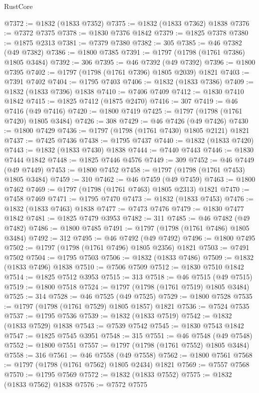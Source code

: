 \begin{lexlean}{RustCore}
\begin{coremodule}
@7372 := @1832 (@1833 @7352)
@7375 := @1832 (@1833 @7362) @1838
@7376 := @7372 @7375
@7378 := @1830 @7376 @1842
@7379 := @1825 @7378
@7380 := @1875 @2313
@7381 := @7379 @7380
@7382 := 305
@7385 := @46 @7382 (@49 @7382)
@7386 := @1800 @7385
@7391 := @1797 (@1798 (@1761 @7386) @1805 @3484)
@7392 := 306
@7395 := @46 @7392 (@49 @7392)
@7396 := @1800 @7395
@7402 := @1797 (@1798 (@1761 @7396) @1805 @2039) @1821
@7403 := @7391 @7402
@7404 := @1795 @7403
@7406 := @1832 (@1833 @7386)
@7409 := @1832 (@1833 @7396) @1838
@7410 := @7406 @7409
@7412 := @1830 @7410 @1842
@7415 := @1825 @7412 (@1875 @2470)
@7416 := 307
@7419 := @46 @7416 (@49 @7416)
@7420 := @1800 @7419
@7425 := @1797 (@1798 (@1761 @7420) @1805 @3484)
@7426 := 308
@7429 := @46 @7426 (@49 @7426)
@7430 := @1800 @7429
@7436 := @1797 (@1798 (@1761 @7430) @1805 @2121) @1821
@7437 := @7425 @7436
@7438 := @1795 @7437
@7440 := @1832 (@1833 @7420)
@7443 := @1832 (@1833 @7430) @1838
@7444 := @7440 @7443
@7446 := @1830 @7444 @1842
@7448 := @1825 @7446 @4576
@7449 := 309
@7452 := @46 @7449 (@49 @7449)
@7453 := @1800 @7452
@7458 := @1797 (@1798 (@1761 @7453) @1805 @3484)
@7459 := 310
@7462 := @46 @7459 (@49 @7459)
@7463 := @1800 @7462
@7469 := @1797 (@1798 (@1761 @7463) @1805 @2313) @1821
@7470 := @7458 @7469
@7471 := @1795 @7470
@7473 := @1832 (@1833 @7453)
@7476 := @1832 (@1833 @7463) @1838
@7477 := @7473 @7476
@7479 := @1830 @7477 @1842
@7481 := @1825 @7479 @3953
@7482 := 311
@7485 := @46 @7482 (@49 @7482)
@7486 := @1800 @7485
@7491 := @1797 (@1798 (@1761 @7486) @1805 @3484)
@7492 := 312
@7495 := @46 @7492 (@49 @7492)
@7496 := @1800 @7495
@7502 := @1797 (@1798 (@1761 @7496) @1805 @2356) @1821
@7503 := @7491 @7502
@7504 := @1795 @7503
@7506 := @1832 (@1833 @7486)
@7509 := @1832 (@1833 @7496) @1838
@7510 := @7506 @7509
@7512 := @1830 @7510 @1842
@7514 := @1825 @7512 @3953
@7515 := 313
@7518 := @46 @7515 (@49 @7515)
@7519 := @1800 @7518
@7524 := @1797 (@1798 (@1761 @7519) @1805 @3484)
@7525 := 314
@7528 := @46 @7525 (@49 @7525)
@7529 := @1800 @7528
@7535 := @1797 (@1798 (@1761 @7529) @1805 @1857) @1821
@7536 := @7524 @7535
@7537 := @1795 @7536
@7539 := @1832 (@1833 @7519)
@7542 := @1832 (@1833 @7529) @1838
@7543 := @7539 @7542
@7545 := @1830 @7543 @1842
@7547 := @1825 @7545 @3951
@7548 := 315
@7551 := @46 @7548 (@49 @7548)
@7552 := @1800 @7551
@7557 := @1797 (@1798 (@1761 @7552) @1805 @3484)
@7558 := 316
@7561 := @46 @7558 (@49 @7558)
@7562 := @1800 @7561
@7568 := @1797 (@1798 (@1761 @7562) @1805 @2434) @1821
@7569 := @7557 @7568
@7570 := @1795 @7569
@7572 := @1832 (@1833 @7552)
@7575 := @1832 (@1833 @7562) @1838
@7576 := @7572 @7575

\end{coremodule}
\end{lexlean}
